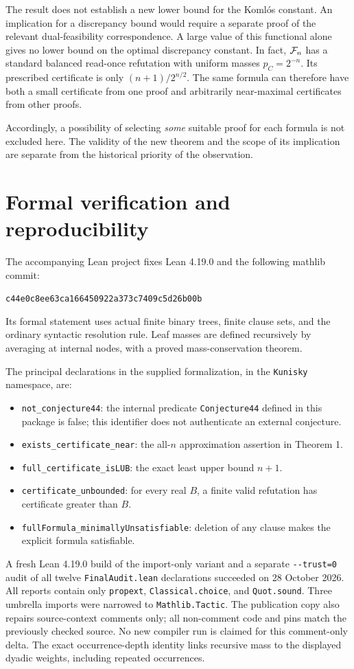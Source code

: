 \documentclass[11pt]{article}
\begin{document}
The result does not establish a new lower bound for the Koml\'os constant. An implication for a discrepancy bound would require a separate proof of the relevant dual-feasibility correspondence. A large value of this functional alone gives no lower bound on the optimal discrepancy constant. In fact, $\mathcal F_n$ has a standard balanced read-once refutation with uniform masses $p_C=2^{-n}$. Its prescribed certificate is only $(n+1)/2^{n/2}$. The same formula can therefore have both a small certificate from one proof and arbitrarily near-maximal certificates from other proofs.

Accordingly, a possibility of selecting \emph{some} suitable proof for each formula is not excluded here. The validity of the new theorem and the scope of its implication are separate from the historical priority of the observation.

\clearpage
\section{Formal verification and reproducibility}
The accompanying Lean project fixes Lean 4.19.0 and the following mathlib commit:
\begin{center}\small\texttt{c44e0c8ee63ca166450922a373c7409c5d26b00b}\end{center}
Its formal statement uses actual finite binary trees, finite clause sets, and the ordinary syntactic resolution rule. Leaf masses are defined recursively by averaging at internal nodes, with a proved mass-conservation theorem.

The principal declarations in the supplied formalization, in the \texttt{Kunisky} namespace, are:
\begin{itemize}[nosep]
\item \texttt{not\_conjecture44}: the internal predicate \texttt{Conjecture44} defined in this package is false; this identifier does not authenticate an external conjecture.
\item \texttt{exists\_certificate\_near}: the all-$n$ approximation assertion in Theorem 1.
\item \texttt{full\_certificate\_isLUB}: the exact least upper bound $n+1$.
\item \texttt{certificate\_unbounded}: for every real $B$, a finite valid refutation has certificate greater than $B$.
\item \texttt{fullFormula\_minimallyUnsatisfiable}: deletion of any clause makes the explicit formula satisfiable.
\end{itemize}
A fresh Lean 4.19.0 build of the import-only variant and a separate \texttt{-{}-trust=0} audit of all twelve \texttt{FinalAudit.lean} declarations succeeded on 28 October 2026. All reports contain only \texttt{propext}, \texttt{Classical.choice}, and \texttt{Quot.sound}. Three umbrella imports were narrowed to \texttt{Mathlib.Tactic}. The publication copy also repairs source-context comments only; all non-comment code and pins match the previously checked source. No new compiler run is claimed for this comment-only delta. The exact occurrence-depth identity links recursive mass to the displayed dyadic weights, including repeated occurrences.
\end{document}
